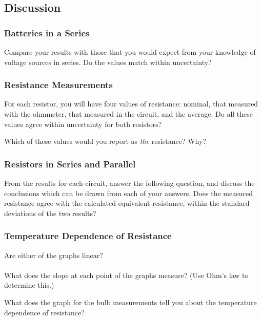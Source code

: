 \subsection{Discussion}
\subsubsection{Batteries in a Series}
Compare your results with those that you would expect from your knowledge of 
voltage sources in series.  Do the values match within uncertainty? \\
\subsubsection{Resistance Measurements}

For each resistor, you will have four values of resistance: nominal, that
measured with the ohmmeter, that measured in the circuit, and the average. 
Do all these values agree within uncertainty for both resistors? 
  
\vspace*{1cm}
\noindent
Which of these values would you report as {\it the} resistance? Why?
\indent
\indent

\subsubsection{Resistors in Series and Parallel}
From the results for each circuit, answer the following question, and discuss
the conclusions which can be drawn from each of your answers. 
Does the measured resistance agree with the 
calculated equivalent resistance, within the standard deviations of the 
two results? 

\subsubsection{Temperature Dependence of Resistance}
\noindent
Are either of the graphs linear?\\ 
\ \\
\noindent
What does the slope at each point of the graphs measure? (Use Ohm's law to
determine this.) 
\vspace*{2cm}

\noindent
What does the graph for the bulb measurements tell you about the temperature
dependence of resistance? 
\vspace*{2cm}


